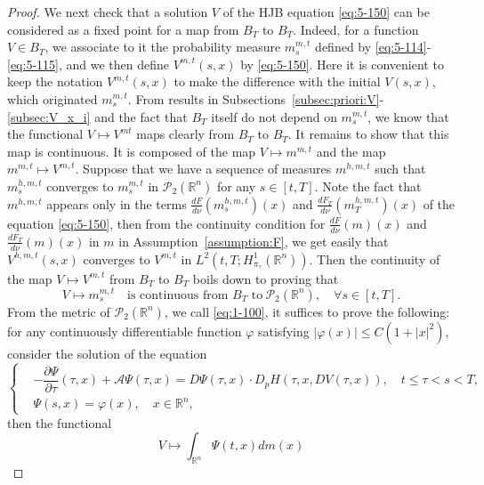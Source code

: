 \documentclass[11pt]{article}
\numberwithin{equation}{section}
\newcommand{\pr}{\mathcal{P}}
\newcommand{\brn}{{\mathbb{R}^n}}
\newcommand{\1}{\mbox{1\hspace{-1mm}I}}
\begin{document}
\begin{proof}
We next check that a solution $V$ of the HJB equation \eqref{eq:5-150} can be considered as a fixed point for a map from $B_{T}$ to $B_{T}$. Indeed, for a function $V\in B_{T}$, we associate to it the probability measure $m^{m,t}_s$ defined by \eqref{eq:5-114}-\eqref{eq:5-115}, and we then define $V^{m,t}(s,x)$ by \eqref{eq:5-150}. Here it is convenient to keep the notation $V^{m,t}(s,x)$ to make the difference with the initial $V(s,x)$, which originated $m^{m,t}_s$. From results in Subsections~\ref{subsec:priori:V}-\ref{subsec:V_x_i} and the fact that $B_{T}$ itself do not depend on $m^{m,t}_s$, we know that the functional $V\mapsto V^{mt}$ maps clearly from $B_{T}$ to $B_{T}$. It remains to show that this map is continuous. It is composed of the map $V\mapsto m^{m,t}$ and the map $m^{m,t}\mapsto V^{m,t}$. Suppose that we have a sequence of measures $m^{h,m,t}$ such that $m^{h,m,t}_s$ converges to $ m^{m,t}_s$ in $\pr_2(\brn)$ for any $s\in[t,T]$. Note the fact that $m^{h,m,t}$ appears only in the terms $\frac{dF}{d\nu}\left(m^{h,m,t}_s\right)(x)$ and $\frac{dF_T}{d\nu}\left(m^{h,m,t}_T\right)(x)$ of the equation \eqref{eq:5-150}, then from the continuity condition for $\frac{dF}{d\nu}(m)(x)$ and $\frac{dF_T}{d\nu}(m)(x)$ in $m$ in Assumption~\ref{assumption:F}, we get easily that $V^{h,m,t}(s,x)$ converges to $V^{m,t}$ in $L^{2}\left(t,T;H_{\pi_{\gamma}}^{1}(\brn)\right)$. Then the continuity of the map $V\mapsto V^{m,t}$ from $B_{T}$ to $B_{T}$ boils down to proving that 
\begin{equation}\label{eq:5-122}
    V\mapsto m^{m,t}_s \quad \text{is continuous from }B_{T} \text{ to}\ \pr_2(\brn),\quad \forall s\in[t,T].
\end{equation}
From the metric of $\pr_2(\brn)$, we call \eqref{eq:1-100}, it suffices to prove the following: for any continuously differentiable function $\varphi$ satisfying $|\varphi(x)|\le C\left(1+|x|^{2}\right)$, consider the solution of the equation
\begin{equation}\label{eq:5-123}
\left\{
\begin{aligned}
    &-\dfrac{\partial\Psi}{\partial\tau}(\tau,x)+\mathcal{A}\Psi(\tau,x)=D\Psi(\tau,x)\cdot D_{p}H(\tau,x,DV(\tau,x)),\quad t\le\tau<s<T,\\
    &\Psi(s,x)=\varphi(x),\quad x\in\brn,
\end{aligned}
\right.
\end{equation}
then the functional 
\begin{equation}\label{eq:5-124}
    V\mapsto\int_{\brn}\Psi(t,x)dm(x)
\end{equation}

\end{proof}
\end{document}
